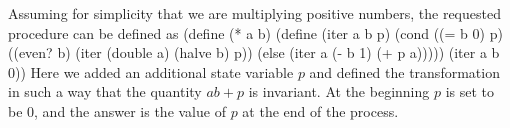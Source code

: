 Assuming for simplicity that we are multiplying positive numbers, the requested procedure can be defined as
\begtt\scm
(define (* a b)
  (define (iter a b p)
    (cond ((= b 0) p)
          ((even? b) (iter (double a) (halve b) p))
          (else (iter a (- b 1) (+ p a)))))
  (iter a b 0))
\endtt
Here we added an additional state variable $p$ and defined the transformation in such a way that the quantity $ab + p$ is invariant.  At the beginning $p$ is set to be $0$, and the answer is the value of $p$ at the end of the process.
